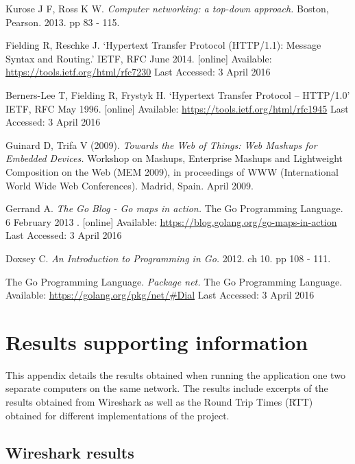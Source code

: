 \documentclass[10pt,twocolumn]{witseiepaper}
\begin{document}
\begin{thebibliography}{1}

 Kurose J F, Ross K W. \emph{Computer networking: a top-down approach.} Boston, Pearson. 2013. pp 83 - 115.

 Fielding R, Reschke J. `Hypertext Transfer Protocol (HTTP/1.1): Message Syntax and Routing.' IETF, RFC June 2014. [online] Available: \url{https://tools.ietf.org/html/rfc7230} Last Accessed: 3 April 2016

 Berners-Lee T, Fielding R, Frystyk H. `Hypertext Transfer Protocol -- HTTP/1.0' IETF, RFC May 1996. [online] Available: \url{https://tools.ietf.org/html/rfc1945} Last Accessed: 3 April 2016

   Guinard D, Trifa V (2009). \emph{Towards the Web of Things: Web Mashups for Embedded Devices.} Workshop on Mashups, Enterprise Mashups and Lightweight Composition on the Web (MEM 2009), in proceedings of WWW (International World Wide Web Conferences). Madrid, Spain. April 2009.  

 Gerrand A. \emph{The Go Blog - Go maps in action.} The Go Programming Language. 6 February 2013 . [online] Available: \url{https://blog.golang.org/go-maps-in-action} Last Accessed: 3 April 2016

 Doxsey C. \emph{An Introduction to Programming in Go.} 2012. ch 10. pp 108 - 111.

 The Go Programming Language. \emph{Package net.} The Go Programming Language. Available: \url{https://golang.org/pkg/net/#Dial} Last Accessed: 3 April 2016


\end{thebibliography}

\onecolumn
\clearpage
\newpage
\appendix
\section{Results supporting information} %
\label{sec:results}
	
	This appendix details the results obtained when running the application one two separate computers on the same network. The results include excerpts of the results obtained from Wireshark as well as the Round Trip Times (RTT) obtained for different implementations of the project.

	\subsection{Wireshark results} %
	\label{sub:wireshark_results}
	
\end{document}
